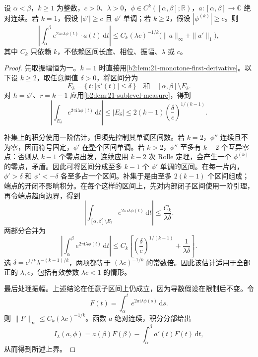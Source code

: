 \begin{theorem}\label{b2:thm:21-vdc}
设 \(\alpha<\beta\)，\(k\geq1\) 为整数，\(c>0\)、\(\lambda>0\)，\(\phi\in C^k([\alpha,\beta];\mathbb R)\)，\(a:[\alpha,\beta]\to\mathbb C\) 绝对连续。若 \(k=1\)，假设 \(|\phi'|\geq c\) 且 \(\phi'\) 单调；若 \(k\geq2\)，假设 \(|\phi^{(k)}|\geq c\)。则
\[
 \left|\int_\alpha^\beta
 e^{2\pi\mathrm i\lambda\phi(t)}\cdot a(t)\,\mathrm dt\right|
 \leq C_k(\lambda c)^{-1/k}
       \bigl(\|a\|_\infty+\|a'\|_1\bigr),
\]
其中 \(C_k\) 只依赖 \(k\)，不依赖区间长度、相位、振幅、\(\lambda\) 或 \(c\)。
\end{theorem}
\begin{proof}
先取振幅恒为一。\(k=1\) 时直接用\cref{b2:lem:21-monotone-first-derivative}。以下设 \(k\geq2\)，取任意阈值 \(\delta>0\)，将区间分为
\[
 E_\delta=\{\,t:|\phi'(t)|\leq\delta\,\}
 \quad\text{和}\quad
 [\alpha,\beta]\setminus E_\delta.
\]
对 \(h=\phi'\)、\(r=k-1\) 应用\cref{b2:lem:21-sublevel-measure}，得到
\[
 \left|\int_{E_\delta}e^{2\pi\mathrm i\lambda\phi(t)}
                         \,\mathrm dt\right|
 \leq |E_\delta|
 \leq 2(k-1)\left(\frac{\delta}{c}\right)^{1/(k-1)}.
\]

补集上的积分使用一阶估计，但须先控制其单调区间数。若 \(k=2\)，\(\phi''\) 连续且不为零，因而符号固定，\(\phi'\) 在整个区间单调。若 \(k>2\)，\(\phi''\) 至多有 \(k-2\) 个互异零点：否则从 \(k-1\) 个零点出发，连续应用 \(k-2\) 次 Rolle 定理，会产生一个 \(\phi^{(k)}\) 的零点，矛盾。因此可将区间分成至多 \(k-1\) 个 \(\phi'\) 单调的区间。在每一片内，\(\phi'>\delta\) 和 \(\phi'<-\delta\) 各至多占一个区间。补集于是由至多 \(2(k-1)\) 个区间组成；端点的开闭不影响积分。在每个这样的区间上，先对内部闭子区间使用一阶引理，再令端点趋向边界，得到
\[
 \left|\int_{[\alpha,\beta]\setminus E_\delta}
             e^{2\pi\mathrm i\lambda\phi(t)}\,\mathrm dt\right|
 \leq \frac{C_k}{\lambda\delta}.
\]
两部分合并为
\[
 \left|\int_\alpha^\beta
          e^{2\pi\mathrm i\lambda\phi(t)}\,\mathrm dt\right|
 \leq C_k\left[
       \left(\frac{\delta}{c}\right)^{1/(k-1)}
       +\frac1{\lambda\delta}\right].
\]
选
\(\delta=c^{1/k}\lambda^{-(k-1)/k}\)，两项都等于
\((\lambda c)^{-1/k}\) 的常数倍。因此该估计适用于全部正的 \(\lambda,c\)，包括有效参数 \(\lambda c<1\) 的情形。

最后处理振幅。上述结论在任意子区间上仍成立，因为导数假设在限制后不变。令
\[
 F(t)=\int_\alpha^t e^{2\pi\mathrm i\lambda\phi(s)}\,\mathrm ds.
\]
则 \(\|F\|_\infty\leq C_k(\lambda c)^{-1/k}\)。函数 \(a\) 绝对连续，积分分部给出
\[
 I_\lambda(a,\phi)
 =a(\beta)F(\beta)-\int_\alpha^\beta a'(t)F(t)\,\mathrm dt,
\]
从而得到所述上界。
\end{proof}

